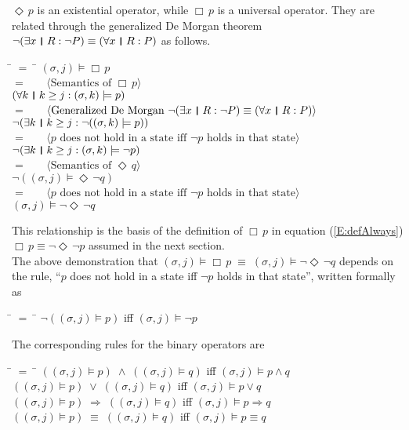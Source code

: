 \documentclass[fleqn, leqno]{article}
\newcommand{\lgap}{2pt} %
\newcommand{\mymathindent}{24pt} %
\newcommand{\equivs}{\ensuremath{\;\equiv\;}} %
\newcommand{\impl}{\ensuremath{\Rightarrow}} %
\newcommand{\Event}{\Diamond\,}
\newcommand{\Always}{\Box\,}
\newcommand{\thedr}{\rule[-.25ex]{.32mm}{1.75ex}} %
\newcommand{\dr}{\;\,\thedr\,\;} %
\newcommand{\rb}{:} %
\newcommand{\all}{\forall} %
\newcommand{\ext}{\exists} %
\newcommand{\Gll} {\langle} %
\newcommand{\Ggg} {\rangle} %
\newcommand{\Hint}[1] {\ \ \ $\Gll \mbox{#1} \Ggg$ } %
\begin{document}
$\Event p$ is an existential operator, while $\Always p$ is a universal operator.
They are related through the generalized De Morgan theorem \cite{LADM} $\lnot (\ext x\dr R\rb \lnot P)\equiv (\all x\dr R\rb P)$
as follows.

\begin{tabbing}
\hspace{\mymathindent} \= $= \;$ \= \kill
\> \> $(\sigma, j) \models \Always p$\\[\lgap]
\> $=$ \> \Hint{Semantics of $\Always p$}\\[\lgap]
\> \> $(\all k \dr k \ge j \rb (\sigma,k) \models p)$\\[\lgap]
\> $=$ \> \Hint{Generalized De Morgan $\lnot (\ext x\dr R\rb \lnot P)\equiv (\all x\dr R\rb P)$}\\[\lgap]
\> \> $\lnot (\ext k \dr k \ge j \rb \lnot((\sigma,k) \models p))$\\[\lgap]
\> $=$ \> \Hint{$p$ does not hold in a state iff $\lnot p$ holds in that state}\\[\lgap]
\> \> $\lnot (\ext k \dr k \ge j \rb (\sigma,k) \models \lnot p)$\\[\lgap]
\> $=$ \> \Hint{Semantics of $\Event q$}\\[\lgap]
\> \> $\lnot ((\sigma, j) \models \Event \lnot q)$\\[\lgap]
\> $=$ \> \Hint{$p$ does not hold in a state iff $\lnot p$ holds in that state}\\[\lgap]
\> \> $(\sigma, j) \models \lnot \Event \lnot q$
\end{tabbing}

This relationship is the basis of the definition of $\Always p$ in equation (\ref{E:defAlways})
$\Always p \equiv \lnot\Event\lnot p$ assumed in the next section.\\

The above demonstration that $(\sigma, j) \models \Always p \equivs (\sigma, j) \models \lnot \Event \lnot q$ depends on the
rule, ``$p$ does not hold in a state iff $\lnot p$ holds in that state'', written formally as

\begin{tabbing}
\hspace{\mymathindent} \= $= \;$ \= \kill
\> $\lnot ((\sigma, j) \models p)$ \quad iff \quad $(\sigma, j) \models \lnot p$
\end{tabbing}

The corresponding rules for the binary operators are

\begin{tabbing}
\hspace{\mymathindent} \= $= \;$ \= \kill
\> $((\sigma, j) \models p) \;\land\; ((\sigma, j) \models q)$ \quad iff \quad $(\sigma, j) \models p\land q$\\
\> $((\sigma, j) \models p) \;\lor\; ((\sigma, j) \models q)$ \quad iff \quad $(\sigma, j) \models p\lor q$\\
\> $((\sigma, j) \models p) \;\impl\; ((\sigma, j) \models q)$ \quad iff \quad $(\sigma, j) \models p \impl q$\\
\> $((\sigma, j) \models p) \;\equiv\; ((\sigma, j) \models q)$ \quad iff \quad $(\sigma, j) \models p \equiv q$
\end{tabbing}
\end{document}
